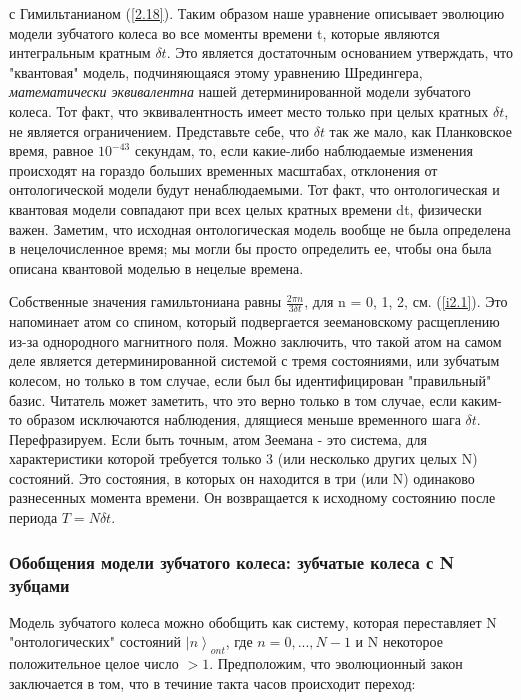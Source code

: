 \documentclass[main.tex]{subfiles}
\begin{document}
с Гимильтанианом (\ref{2.18}). Таким образом наше уравнение описывает эволюцию модели зубчатого колеса во все моменты времени t, которые являются интегральным кратным $\delta t$. Это является достаточным основанием утверждать, что "квантовая" модель, подчиняющаяся этому уравнению Шредингера, \textit{математически эквивалентна} нашей детерминированной модели зубчатого колеса. Тот факт, что эквивалентность имеет место только при целых кратных $\delta t$, не является ограничением. Представьте себе, что $\delta t$ так же мало, как Планковское время, равное $10^{-43}$ секундам, то, если какие-либо наблюдаемые изменения происходят на гораздо больших временных масштабах, отклонения от онтологической модели будут ненаблюдаемыми. Тот факт, что онтологическая и квантовая модели совпадают при всех целых кратных времени dt, физически важен. Заметим, что исходная онтологическая модель вообще не была определена в нецелочисленное время; мы могли бы просто определить ее, чтобы она была описана квантовой моделью в нецелые времена.   

Собственные значения гамильтониана равны $\frac{2 \pi n}{3 \delta t}$, для n = 0, 1, 2, см. (\ref{i2.1}). Это напоминает атом со спином, который подвергается зеемановскому расщеплению из-за однородного магнитного поля. Можно заключить, что такой атом на самом деле является детерминированной системой с тремя состояниями, или зубчатым колесом, но только в том случае, если был бы идентифицирован "правильный" базис. Читатель может заметить, что это верно только в том случае, если каким-то образом исключаются наблюдения, длящиеся меньше временного шага $\delta t$. Перефразируем. Если быть точным, атом Зеемана - это система, для характеристики которой требуется только 3 (или несколько других целых N) состояний. Это состояния, в которых он находится в три (или N) одинаково разнесенных момента времени. Он возвращается к исходному состоянию после периода $T = N\delta t $.


\subsubsection{Обобщения модели зубчатого колеса: зубчатые колеса с N зубцами}\label{ch2.2.1}

Модель зубчатого колеса можно обобщить как систему, которая переставляет N "онтологических" состояний $\left|n\right>_{ont}$, где $n = 0, ..., N-1$ и N некоторое положительное целое число $> 1$. Предположим, что эволюционный закон заключается в том, что в течиние такта часов происходит переход:
\end{document}

